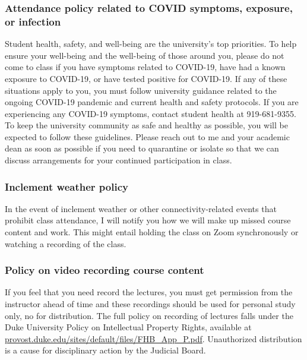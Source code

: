 \documentclass[
  letterpaper,
  DIV=11,
  numbers=noendperiod]{scrartcl}
\begin{document}
\hypertarget{attendance-policy-related-to-covid-symptoms-exposure-or-infection}{%
\subsubsection{Attendance policy related to COVID symptoms, exposure, or
infection}\label{attendance-policy-related-to-covid-symptoms-exposure-or-infection}}

Student health, safety, and well-being are the university's top
priorities. To help ensure your well-being and the well-being of those
around you, please do not come to class if you have symptoms related to
COVID-19, have had a known exposure to COVID-19, or have tested positive
for COVID-19. If any of these situations apply to you, you must follow
university guidance related to the ongoing COVID-19 pandemic and current
health and safety protocols. If you are experiencing any COVID-19
symptoms, contact student health at 919-681-9355. To keep the university
community as safe and healthy as possible, you will be expected to
follow these guidelines. Please reach out to me and your academic dean
as soon as possible if you need to quarantine or isolate so that we can
discuss arrangements for your continued participation in class.

\hypertarget{inclement-weather-policy}{%
\subsubsection{Inclement weather
policy}\label{inclement-weather-policy}}

In the event of inclement weather or other connectivity-related events
that prohibit class attendance, I will notify you how we will make up
missed course content and work. This might entail holding the class on
Zoom synchronously or watching a recording of the class.

\hypertarget{policy-on-video-recording-course-content}{%
\subsubsection{Policy on video recording course
content}\label{policy-on-video-recording-course-content}}

If you feel that you need record the lectures, you must get permission
from the instructor ahead of time and these recordings should be used
for personal study only, no for distribution. The full policy on
recording of lectures falls under the Duke University Policy on
Intellectual Property Rights, available at
\href{https://provost.duke.edu/sites/default/files/FHB_App_P.pdf}{provost.duke.edu/sites/default/files/FHB\_App\_P.pdf}.
Unauthorized distribution is a cause for disciplinary action by the
Judicial Board.
\end{document}

